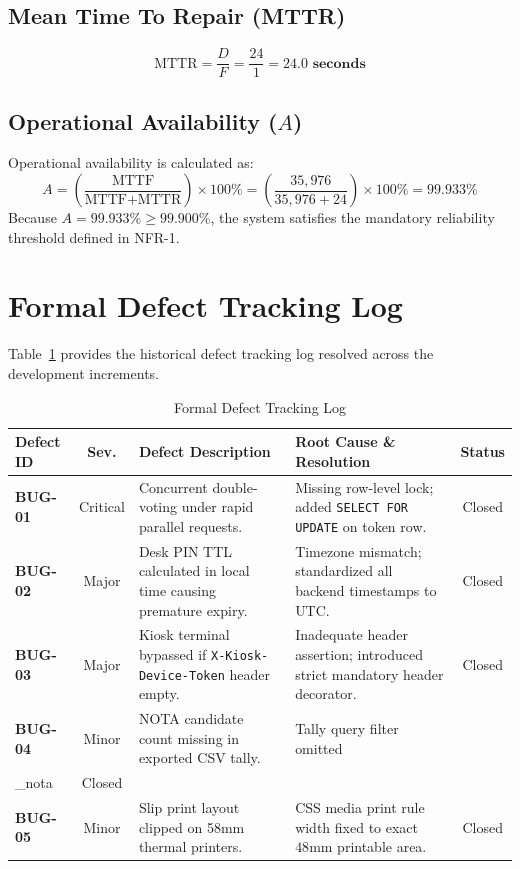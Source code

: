\documentclass[12pt,a4paper,oneside]{report}
\begin{document}
\subsection{Mean Time To Repair (MTTR)}
\begin{equation}
    \text{MTTR} = \frac{D}{F} = \frac{24}{1} = \mathbf{24.0 \text{ seconds}}
\end{equation}

\subsection{Operational Availability ($A$)}
Operational availability is calculated as:
\begin{equation}
    A = \left( \frac{\text{MTTF}}{\text{MTTF} + \text{MTTR}} \right) \times 100\% = \left( \frac{35,976}{35,976 + 24} \right) \times 100\% = \mathbf{99.933\%}
\end{equation}
Because $A = 99.933\% \ge 99.900\%$, the system satisfies the mandatory reliability threshold defined in NFR-1.

\section{Formal Defect Tracking Log}
Table~\ref{tab:defect_log} provides the historical defect tracking log resolved across the development increments.

\begin{table}[H]
    \centering
    \caption{Formal Defect Tracking Log}
    \label{tab:defect_log}
    \begin{tabularx}{\textwidth}{l c p{4.2cm} X c}
        \toprule
        \textbf{Defect ID} & \textbf{Sev.} & \textbf{Defect Description} & \textbf{Root Cause \& Resolution} & \textbf{Status} \\
        \midrule
        \textbf{BUG-01} & Critical & Concurrent double-voting under rapid parallel requests. & Missing row-level lock; added \texttt{SELECT FOR UPDATE} on token row. & Closed \\
        \textbf{BUG-02} & Major & Desk PIN TTL calculated in local time causing premature expiry. & Timezone mismatch; standardized all backend timestamps to UTC. & Closed \\
        \textbf{BUG-03} & Major & Kiosk terminal bypassed if \texttt{X-Kiosk-Device-Token} header empty. & Inadequate header assertion; introduced strict mandatory header decorator. & Closed \\
        \textbf{BUG-04} & Minor & NOTA candidate count missing in exported CSV tally. & Tally query filter omitted \texttt{is\\_nota} flag; added explicit NOTA column. & Closed \\
        \textbf{BUG-05} & Minor & Slip print layout clipped on 58mm thermal printers. & CSS media print rule width fixed to exact $48\text{mm}$ printable area. & Closed \\
        \bottomrule
    \end{tabularx}
\end{table}
\end{document}
